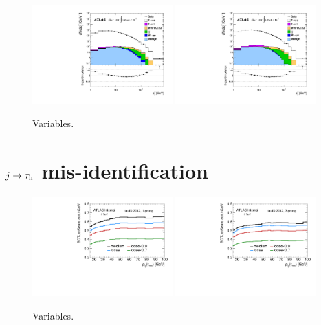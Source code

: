 \begin{figure}[tp]
  \centering
  \includegraphics[width=0.48\textwidth]{figures/STDM-2012-23/fig_01a}
  \includegraphics[width=0.48\textwidth]{figures/STDM-2012-23/fig_01b}
  \caption{Variables.}
  \label{fig:backgrounds-zpt}
\end{figure}

\clearpage
\section{$j \rightarrow \tau_\mathrm{h}$ mis-identification}
\label{sec:backgrounds-misid}

\begin{figure}[tp]
  \centering
  \includegraphics[width=0.48\textwidth]{figures/backgrounds/jetBDT-1p}
  \includegraphics[width=0.48\textwidth]{figures/backgrounds/jetBDT-3p}
  \caption{Variables.}
  \label{fig:backgrounds-workingpoints}
\end{figure}

